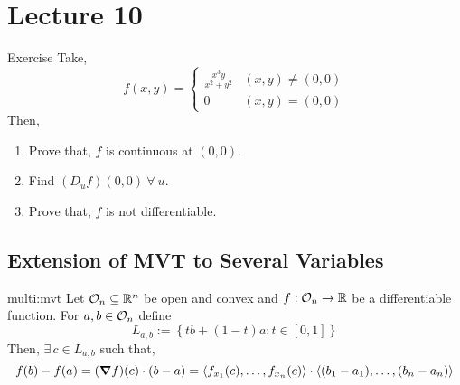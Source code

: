 \documentclass[../Analysis-3.tex]{subfiles}
\begin{document}
\chapter*{Lecture 10} %
\setcounter{chapter}{10} %


\begin{Eg}{Exercise}{}
  Take, \[ f(x,y) = \begin{cases}
      \frac{x^{3}y}{x^2 + y^2} & (x,y) \neq (0,0) \\
      0                        & (x,y) = (0,0)
    \end{cases}\]
  Then,
  \begin{enumerate}[label=(\roman*)]
    \item Prove that, $f$ is continuous at $(0,0)$.
    \item Find $(D_{u}f)(0,0)\ \forall\ u$.
    \item Prove that, $f$ is not differentiable.
  \end{enumerate}
\end{Eg}

\section{Extension of MVT to Several Variables}

\begin{Thm}{}{multi:mvt}
  Let $ \mathcal{O}_{n} \subseteq \mathbb{R}^n $ be open and convex and $f : \mathcal{O}_{n} \to \mathbb{R}$ be a differentiable function. For $a,b \in \mathcal{O}_{n}$ define \[L_{a,b} := \left\{ tb + (1-t)a : t \in [0,1]\right\} \]
  Then, $\exists\, c \in L_{a,b}$ such that, \[ f(b) - f(a) = (\grad f)(c)\cdot (b-a) = \left\langle f_{x_1}(c), \ldots, f_{x_n}(c) \right\rangle \cdot \left\langle (b_1 - a_1), \ldots, (b_n - a_n) \right\rangle  \]
\end{Thm}
\end{document}
